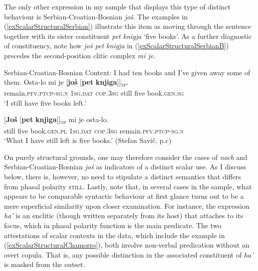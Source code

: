 The only other expression in my sample that displays this type of distinct behaviour is Serbian\hyp Croatian\hyp Bosnian \textit{još}. The examples in (\ref{exScalarStructuralSerbian}) illustrate this item as moving through the sentence together with its sister constituent \textit{pet knigja} \lq five books\rq{}. As a further diagnostic of constituency, note how \textit{još pet knigja} in (\ref{exScalarStructuralSerbianB}) precedes the second-position clitic complex \textit{mi je}.
\begin{exe}
	 \ex 	\label{exScalarStructuralSerbian}

	\begin{xlist}	 
	\exi{}Serbian-Croatian-Bosnian
	 \exi{}Context: I had ten books and I've given away some of them.
		\ex  
		\gll Osta-lo mi je \textup{[}\textbf{još} \textup{[}\textbf{pet} \textbf{knjiga}\textup{]]\textsubscript{\textsc{np}}}.\\
  	 remain.\textsc{pfv}.\textsc{ptcp}-\textsc{sg}.\textsc{n} 1\textsc{sg}.\textsc{dat} \textsc{cop}.3\textsc{sg} \phantom{[}still \phantom{[}five book.\textsc{gen}.\textsc{sg}\\
	 \glt  \lq I still have five books left.\rq{}
		
	\ex\label{exScalarStructuralSerbianB}
	\gll \textup{[}\textbf{Još} \textup{[}\textbf{pet} \textbf{knjiga}\textup{]]}\textsubscript{\textsc{np}} mi je osta-lo.\\
	   \phantom{[}still \phantom{[}five  book.\textsc{gen}.\textsc{pl} 1\textsc{sg}.\textsc{dat} \textsc{cop}.3\textsc{sg} remain.\textsc{pfv}.\textsc{ptcp}-\textsc{sg}.\textsc{n}\\
	 \glt \lq What I have still left is five books.\rq{ }(Stefan Savič, p.c)
	 \end{xlist}
\end{exe}

On purely structural grounds, one may therefore consider the cases of  \textit{noch} and Serbian\hyp Croatian\hyp Bosnian \textit{još} as indicators of a distinct scalar use. As I discuss below, there is, however, no need to stipulate a distinct semantics that differs from phasal polarity \textsc{still}. Lastly, note that, in several cases in the sample, what appears to be comparable syntactic behaviour at first glance turns out to be a mere superficial similarity upon closer examination. For instance, the  expression \textit{ha'} is an enclitic (though written separately from its host) that attaches to its focus, which in phasal polarity function is the main predicate. The two attestations of scalar contexts in the data, which include the example in (\ref{exScalarStructuralChamorro}), both involve non-verbal predication without an overt copula. That is, any possible distinction in the associated constituent of \textit{ha'} is masked from the outset.

